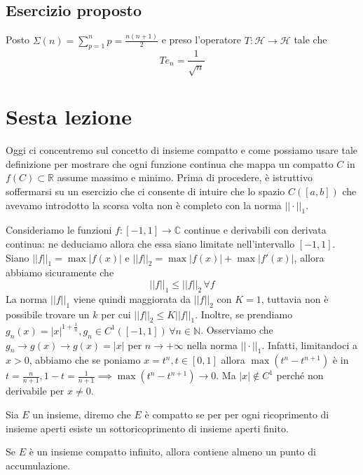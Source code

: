 \documentclass[12pt, twoside, italian, openany]{book}
\begin{document}
	\section{Esercizio proposto}
	Posto $\Sigma(n) = \sum_{p=1}^n p = \frac{n(n+1)}{2}$ e preso l'operatore $T: \mathcal{H} \to \mathcal{H}$ tale che
	$$
		Te_n = \frac{1}{\sqrt{n}}
	$$
	\chapter{Sesta lezione}
	Oggi ci concentremo sul concetto di insieme compatto e come possiamo usare tale definizione per mostrare che ogni funzione continua che mappa un compatto $C$ in $f(C) \subset \mathbb{R}$ assume massimo e minimo. Prima di procedere, è istruttivo soffermarsi su un esercizio
	che ci consente di intuire che lo spazio $C([a, b])$ che avevamo introdotto la scorsa volta non è completo con la norma $||\cdot||_1$. \\
	\begin{exercise}
	\end{exercise}
		Consideriamo le funzioni $f: [-1, 1] \to \mathbb{C}$ continue e derivabili con derivata continua: ne deduciamo allora che essa siano limitate nell'intervallo $[-1, 1]$. Siano $||f||_1 = \max{|f(x)|}$ e $||f||_2 = \max{|f(x)|} + \max{|f'(x)|}$, allora abbiamo sicuramente che
		$$
		||f||_1 \leq ||f||_2 \, \forall f
		$$
		La norma $||f||_1$ viene quindi maggiorata da $||f||_2$ con $K = 1$, tuttavia non è possibile trovare un $k$ per cui $||f||_2 \leq K ||f||_1$. Inoltre, se prendiamo $g_n(x) = |x|^{1 + \frac{1}{n}}, g_n \in C^1([-1, 1]) \, \forall n \in \mathbb{N}$. Osserviamo che $g_n \to g(x) \to g(x) = |x|$ per $n \to +\infty$ nella norma $||\cdot||_1$. Infatti, limitandoci a $x > 0$, abbiamo che se poniamo $x = t^n, t \in [0, 1]$ allora $\max(t^{n}-t^{n+1})$ è in $t = \frac{n}{n+1}, 1-t = \frac{1}{n+1} \implies \max(t^n - t^{n+1}) \to 0.$ Ma $|x| \not\in C^1$ perché non derivabile per $x \neq 0$.
	\begin{definition}
		Sia $E$ un insieme, diremo che $E$ è compatto se per per ogni ricoprimento di insieme aperti esiste un sottoricoprimento di insieme aperti finito.
	\end{definition}
	\begin{prop}
		Se $E$ è un insieme compatto infinito, allora contiene almeno un punto di accumulazione.
	\end{prop}
\end{document}
